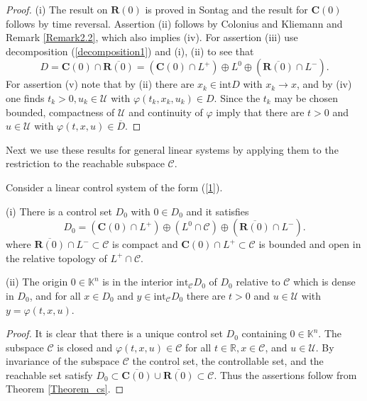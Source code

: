 \documentclass{siamltex}%
\begin{document}
\begin{proof}
(i) The result on $\mathbf{R}(0)$ is proved in Sontag \cite[Corollary
3.6.7]{Son98} and the result for $\mathbf{C}(0)$ follows by time reversal.
Assertion (ii) follows by Colonius and Kliemann \cite[Example 3.2.16]{ColK00}
and Remark \ref{Remark2.2}, which also implies (iv). For assertion (iii) use
decomposition (\ref{decomposition1}) and (i), (ii) to see that%
\[
D=\mathbf{C}(0)\cap\overline{\mathbf{R}(0)}=(\mathbf{C}(0)\cap L^{+})\oplus
L^{0}\oplus(\overline{\mathbf{R}(0)}\cap L^{-}).
\]
For assertion (v) note that by (ii) there are $x_{k}\in\mathrm{int}D$ with
$x_{k}\rightarrow x$, and by (iv) one finds $t_{k}>0,u_{k}\in\mathcal{U}$ with
$\varphi(t_{k},x_{k},u_{k})\in D$. Since the $t_{k}$ may be chosen bounded,
compactness of $\mathcal{U}$ and continuity of $\varphi$ imply that there are
$t>0$ and $u\in\mathcal{U}$ with $\varphi(t,x,u)\in\overline{D}$.
\end{proof}

Next we use these results for general linear systems by applying them to the
restriction to the reachable subspace $\mathcal{C}$.

\begin{corollary}
\label{Corollary_cs}Consider a linear control system of the form (\ref{1}).

(i) There is a control set $D_{0}$ with $0\in D_{0}$ and it satisfies%
\[
D_{0}=\left(  \mathbf{C}(0)\cap L^{+}\right)  \oplus\left(  L^{0}%
\cap\mathcal{C}\right)  \oplus(\overline{\mathbf{R}(0)}\cap L^{-}).
\]
where $\overline{\mathbf{R}(0)}\cap L^{-}\subset\mathcal{C}$ is compact and
$\mathbf{C}(0)\cap L^{+}\subset\mathcal{C}$ is bounded and open in the
relative topology of $L^{+}\cap\mathcal{C}$.

(ii) The origin $0\in\mathbb{K}^{n}$ is in the interior $\mathrm{int}%
_{\mathcal{C}}D_{0}$ of $D_{0}$ relative to $\mathcal{C}$ which is dense in
$D_{0}$, and for all $x\in D_{0}$ and $y\in\mathrm{int}_{\mathcal{C}}D_{0}$
there are $t>0$ and $u\in\mathcal{U}$ with $y=\varphi(t,x,u)$.
\end{corollary}

\begin{proof}
It is clear that there is a unique control set $D_{0}$ containing
$0\in\mathbb{K}^{n}$. The subspace $\mathcal{C}$ is closed and $\varphi
(t,x,u)\in\mathcal{C}$ for all $t\in\mathbb{R},x\in\mathcal{C}$, and
$u\in\mathcal{U}$. By invariance of the subspace $\mathcal{C}$ the control
set, the controllable set, and the reachable set satisfy $D_{0}\subset
\overline{\mathbf{C}(0)}\cup\overline{\mathbf{R}(0)}\subset\mathcal{C}$. Thus
the assertions follow from Theorem \ref{Theorem_cs}.
\end{proof}
\end{document}

